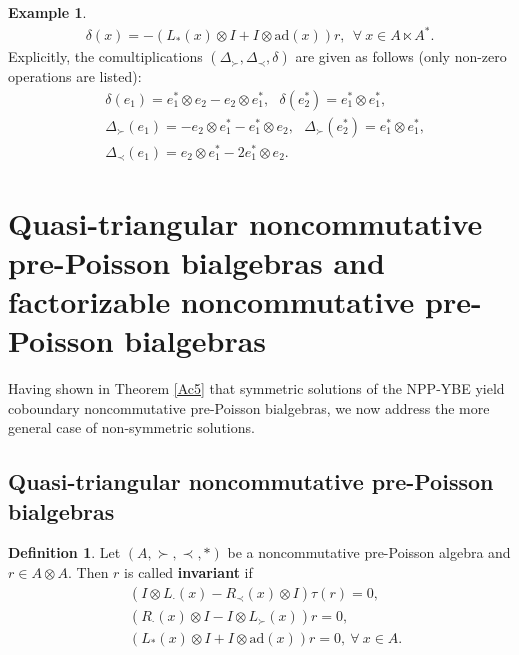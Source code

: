 \documentclass[12pt]{amsart}
\theoremstyle{definition}
\newtheorem{defi}[thm]{Definition}
\newtheorem{ex}[thm]{Example}
\begin{document}
\begin{ex}
\begin{align*}
 \delta(x)=-(L_{\ast}(x)\otimes I+I\otimes \mathrm{ad}(x))r,~~\forall~x\in A\ltimes A^{*}.
\end{align*}
Explicitly, the comultiplications $(\Delta_{\succ}, \Delta_{\prec},\delta)$ are given as follows (only non-zero operations are listed): 
 \begin{align*}&
\delta(e_1)=e_1^{*}\otimes e_2-e_2\otimes e_1^{*}, \ \ \ \delta(e_{2}^{*})=e_1^{*}\otimes e_1^{*},
\\&
\Delta_{\succ}(e_1)=-e_2\otimes e_1^{*} -e_1^{*}\otimes e_2 ,\ \ \ \Delta_{\succ}(e_2^{*})=e_1^{*} \otimes e_1^{*},
\\&
  \Delta_{\prec}(e_1)=e_2\otimes e_1^{*}-2e_1^{*}\otimes e_2.
\end{align*}
\end{ex}
\section{Quasi-triangular noncommutative pre-Poisson bialgebras and factorizable noncommutative pre-Poisson bialgebras}
Having shown in Theorem \ref{Ac5} that symmetric solutions of the NPP-YBE
 yield coboundary noncommutative pre-Poisson bialgebras, we now address the more general case of non-symmetric solutions.

\subsection{Quasi-triangular noncommutative pre-Poisson bialgebras}
\begin{defi} \label{In}
 Let $(A,\succ,\prec,\ast)$ be a noncommutative pre-Poisson algebra and $r\in A\otimes A$. Then $r$ is called {\bf invariant} if 
 \begin{align}&\label{Iv1}
(I\otimes L_{\cdot}(x)-R_{\prec}(x)\otimes I)\tau(r)=0,
\\&\label{Iv2}(R_{\cdot}(x)\otimes I-I\otimes L_{\succ}(x))r=0,
\\&\label{Iv3}(L_{\ast}(x)\otimes I+I\otimes \mathrm{ad}(x))r=0,~\forall~x\in A.
\end{align}
\end{defi} 
\end{document}
